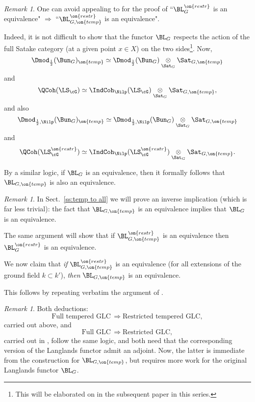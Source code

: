 \documentclass[9pt]{amsart}
\theoremstyle{remark}
\newtheorem{rem}[subsubsection]{Remark}
\theoremstyle{definition}
\theoremstyle{remark}
\newcommand{\secref}[1]{Sect.~\ref{#1}}
\numberwithin{equation}{section}
\begin{document}
\begin{rem} \label{r:L temp}
One can avoid appealing to \cite{FR} for the proof of ``$\BL^{\on{restr}}_G$ is an equivalence" $\Rightarrow$ 
``$\BL^{\on{restr}}_{G,\on{temp}}$ is an equivalence".

\medskip

Indeed, it is not difficult to show that the functor $\BL_G$ respects the action of the full Satake category (at a given 
point $x\in X$) on the two sides\footnote{This will be elaborated on in the subsequent paper in this series.}. 
Now,
$$\Dmod_{\frac{1}{2}}(\Bun_G)_{\on{temp}} \simeq \Dmod_{\frac{1}{2}}(\Bun_G)\underset{\Sat_G}\otimes \Sat_{G,\on{temp}}$$
and
$$\QCoh(\LS_\cG) \simeq \IndCoh_\Nilp(\LS_\cG) \underset{\Sat_G}\otimes \Sat_{G,\on{temp}},$$
and also
$$\Dmod_{\frac{1}{2},\Nilp}(\Bun_G)_{\on{temp}} \simeq \Dmod_{\frac{1}{2},\Nilp}(\Bun_G)\underset{\Sat_G}\otimes \Sat_{G,\on{temp}}$$
and
$$\QCoh(\LS^{\on{restr}}_\cG) \simeq \IndCoh_\Nilp(\LS^{\on{restr}}_\cG) \underset{\Sat_G}\otimes \Sat_{G,\on{temp}}.$$

By a similar logic, if $\BL_G$ is an equivalence, then it formally follows that $\BL_{G,\on{temp}}$ is also an equivalence. 

\end{rem} 

\begin{rem}
In \secref{ss:temp to all} we will prove an inverse implication (which is far less trivial):
the fact that $\BL_{G,\on{temp}}$ is an equivalence implies that
$\BL_G$ is an equivalence.

\medskip

The same argument will show that if $\BL^{\on{restr}}_{G,\on{temp}}$ is an equivalence then
$\BL^{\on{restr}}_G$ is an equivalence.

\end{rem}

\sssec{}

We now claim that \emph{if} $\BL^{\on{restr}}_{G,\on{temp}}$ is an equivalence (for all extensions of the ground field
$k\subset k'$), \emph{then} $\BL_{G,\on{temp}}$ is an equivalence. 

\medskip

This follows by repeating verbatim the argument of \cite[Sect. 21.4]{AGKRRV}. 

\begin{rem}
Both deductions:
$$\text{Full tempered GLC}\, \Rightarrow \text{Restricted tempered GLC},$$
carried out above, and 
$$\text{Full GLC}\, \Rightarrow \text{Restricted GLC},$$
carried out in \cite[Sect. 21.4]{AGKRRV}, 
follow the same logic, and both need that the corresponding version of the Langlands functor admit an adjoint. 
Now, the latter is immediate from the construction for $\BL_{G,\on{temp}}$, but requires more work for the original
Langlands functor $\BL_G$. 
\end{rem} 
\end{document}
